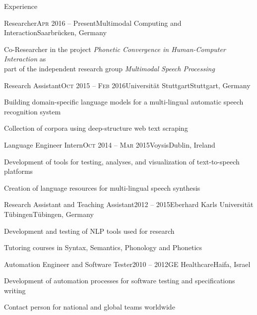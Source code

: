 \documentclass{resume} %
\begin{document}
\begin{rSection}{Experience}

\begin{rSubsection}{Researcher}{\textsc{Apr} 2016 -- Present}{Multimodal Computing and Interaction}{Saarbrücken, Germany}
	\setlength{\itemindent}{.7cm}
	
	\item Co-Researcher in the project \textit{Phonetic Convergence in Human-Computer Interaction} as\\\hspace*{.7cm}part of the independent research group \textit{Multimodal Speech Processing}
	
\end{rSubsection}

\begin{rSubsection}{Research Assistant}{\textsc{Oct} 2015 -- \textsc{Feb} 2016}{Universität Stuttgart}{Stuttgart, Germany}
	\setlength{\itemindent}{.7cm}
	
	\item Building domain-specific language models for a multi-lingual automatic speech recognition system
	
	\item Collection of corpora using deep-structure web text scraping
\end{rSubsection}

\begin{rSubsection}{Language Engineer Intern}{\textsc{Oct} 2014 -- \textsc{Mar} 2015}{Voysis}{Dublin, Ireland}
	\setlength{\itemindent}{.7cm}

	\item Development of tools for testing, analyses, and visualization of text-to-speech platforms
	
	\item Creation of language resources for multi-lingual speech synthesis
\end{rSubsection}

\begin{rSubsection}{Research Assistant and Teaching Assistant}{2012 -- 2015}{Eberhard Karls Universität Tübingen}{Tübingen, Germany}
	\setlength{\itemindent}{.7cm}
	
	\item Development and testing of NLP tools used for research %
	
	\item Tutoring courses in Syntax, Semantics, Phonology and Phonetics %
\end{rSubsection}

\begin{rSubsection}{Automation Engineer and Software Tester}{2010 -- 2012}{GE Healthcare}{Haifa, Israel}
	\setlength{\itemindent}{.7cm}
	
	\item Development of automation processes for software testing and specifications writing
	
	\item Contact person for national and global teams worldwide 
\end{rSubsection}

\end{rSection}
\end{document}
